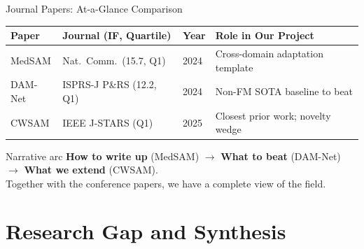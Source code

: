 \documentclass[10pt,aspectratio=169]{beamer}
\begin{document}
\begin{frame}{Journal Papers: At-a-Glance Comparison}
\renewcommand{\arraystretch}{1.4}
\begin{tabularx}{\textwidth}{p{2.4cm} p{3.2cm} p{1.4cm} X}
\toprule
\textbf{Paper} & \textbf{Journal (IF, Quartile)} & \textbf{Year} & \textbf{Role in Our Project} \\
\midrule
MedSAM \cite{Ma2024MedSAM} & Nat.\ Comm.\ (15.7, Q1) & 2024 & Cross-domain adaptation template \\
DAM-Net \cite{Saleh2024DAMNet} & ISPRS-J P\&RS (12.2, Q1) & 2024 & Non-FM SOTA baseline to beat \\
CWSAM \cite{Pu2025CWSAM} & IEEE J-STARS (Q1) & 2025 & Closest prior work; novelty wedge \\
\bottomrule
\end{tabularx}

\vspace{1em}
\begin{exampleblock}{Narrative arc}
\textbf{How to write up} (MedSAM) $\rightarrow$ \textbf{What to beat} (DAM-Net) $\rightarrow$ \textbf{What we extend} (CWSAM). \\
Together with the conference papers, we have a complete view of the field.
\end{exampleblock}
\end{frame}

\section{Research Gap and Synthesis}
\end{document}

